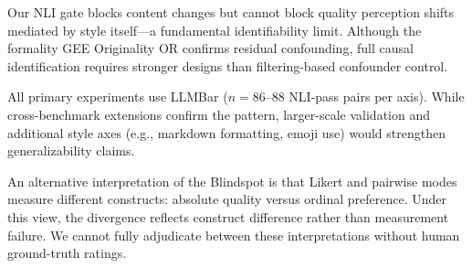 \documentclass[11pt]{article}
\begin{document}
Our NLI gate blocks content changes but cannot block quality perception shifts mediated by style itself---a fundamental identifiability limit. Although the formality GEE Originality OR confirms residual confounding, full causal identification requires stronger designs than filtering-based confounder control.

All primary experiments use LLMBar ($n = 86$--88 NLI-pass pairs per axis). While cross-benchmark extensions confirm the pattern, larger-scale validation and additional style axes (e.g., markdown formatting, emoji use) would strengthen generalizability claims.

An alternative interpretation of the Blindspot is that Likert and pairwise modes measure different constructs: absolute quality versus ordinal preference. Under this view, the divergence reflects construct difference rather than measurement failure. We cannot fully adjudicate between these interpretations without human ground-truth ratings.
\end{document}
